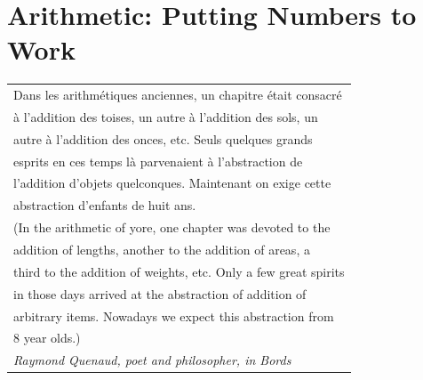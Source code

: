 
\chapter{Arithmetic: Putting Numbers to Work}
\label{ch:arithmetic}


\hfill {\em
\begin{tabular}{l}
Dans les arithm\'{e}tiques anciennes, un chapitre \'{e}tait consacr\'{e} \\
\hspace*{.25in}\`{a} l'addition des toises, un autre \`{a} l'addition des sols, un \\
\hspace*{.25in}autre \`{a} l'addition des onces, etc.  Seuls quelques grands \\
\hspace*{.25in}esprits en ces temps l\`{a} parvenaient \`{a} l'abstraction de \\
\hspace*{.25in}l'addition d'objets quelconques.  Maintenant on exige cette \\
\hspace*{.25in}abstraction d'enfants de huit ans. \\
(In the arithmetic of yore, one chapter was devoted to the \\
\hspace*{.25in}addition of lengths, another to the addition of areas, a \\
\hspace*{.25in}third to the addition of weights, etc. Only a few great spirits  \\
\hspace*{.25in}in those days arrived at the abstraction of addition of    \\
\hspace*{.25in}arbitrary items.  Nowadays we expect this abstraction from  \\
\hspace*{.25in}8 year olds.) \\
\hfill {\em\small Raymond Quenaud, poet and philosopher, in {\em Bords}}
\end{tabular} }

%
%
%
%
%

